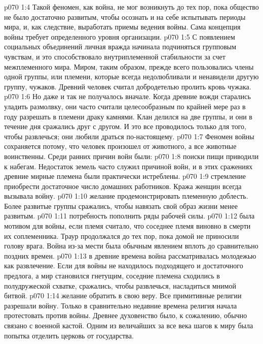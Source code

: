 \vs p070 1:4 Такой феномен, как война, не мог возникнуть до тех пор, пока общество не было достаточно развитым, чтобы осознать и на себе испытывать периоды мира, и, как следствие, выработать приемы ведения войны. Сама концепция войны требует определенного уровня организации.
\vs p070 1:5 С появлением социальных объединений личная вражда начинала подчиняться групповым чувствам, и это способствовало внутриплеменной стабильности за счет межплеменного мира. Миром, таким образом, прежде всего пользовались члены одной группы, или племени, которые всегда недолюбливали и ненавидели другую группу, чужаков. Древний человек считал добродетелью пролить кровь чужака.
\vs p070 1:6 Но даже и так не получалось вначале. Когда древние вожди старались уладить размолвку, они часто считали целесообразным по крайней мере раз в году разрешать в племени драку камнями. Клан делился на две группы, и они в течение дня сражались друг с другом. И это все проводилось только для того, чтобы развлечься; они любили драться по\hyp{}настоящему.
\vs p070 1:7 \pc Феномен войны сохраняется потому, что человек произошел от животного, а все животные воинственны. Среди ранних причин войн были:
\vs p070 1:8 \bibnobreakspace {} поиски пищи приводили к набегам. Недостаток земель часто служил причиной войн, и в этих сражениях древние мирные племена были практически истреблены.
\vs p070 1:9 \pc {}\bibnobreakspace {} стремление приобрести достаточное число домашних работников. Кража женщин всегда вызывала войну.
\vs p070 1:10 \pc {}\bibnobreakspace {} желание продемонстрировать племенную доблесть. Более развитые группы сражались, чтобы навязать свой образ жизни менее развитым.
\vs p070 1:11 \pc {}\bibnobreakspace {} потребность пополнить ряды рабочей силы.
\vs p070 1:12 \pc {}\bibnobreakspace {} была мотивом для войны, если племя считало, что соседнее племя виновно в смерти их соплеменника. Траур продолжался до тех пор, пока домой не приносили голову врага. Война из\hyp{}за мести была обычным явлением вплоть до сравнительно поздних времен.
\vs p070 1:13 \pc {}\bibnobreakspace {} в древние времена война рассматривалась молодежью как развлечение. Если для войны не находилось подходящего и достаточного предлога, а мир становился гнетущим, соседние племена сходились в полудружеской схватке, сражались, чтобы развлечься, насладиться мнимой битвой.
\vs p070 1:14 \pc {}\bibnobreakspace {} желание обратить в свою веру. Все примитивные религии разрешали войну. Только в сравнительно недавние времена религия начала протестовать против войны. Древнее духовенство было, к сожалению, обычно связано с военной кастой. Одним из величайших за все века шагов к миру была попытка отделить церковь от государства.
